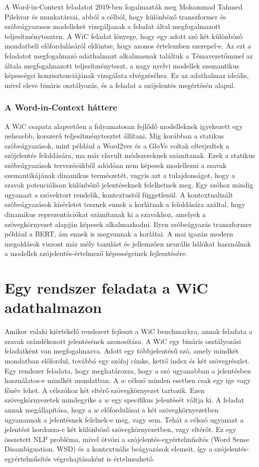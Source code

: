 \documentclass[12pt]{report}
\begin{document}
    A Word-in-Context feladatot 2019-ben fogalmazták meg Mohammad Tahmed Pilehvar és munkatársai, abból a célból, hogy különböző transzformer és szóbeágyazasos modelleket vizsgáljanak a feladat által megfogalmazott teljesítményteszten.
    A WiC feladat lényege, hogy egy adott szó két különböző mondatbeli előfordulásáról eldöntse, hogy azonos értelemben szerepel-e.
    Az ezt a feladatot megfogalmazó adathalmazt alkalmasnak találtuk a Témavezetőmmel az általa megfogalmazott teljesítményteszt, a nagy nyelvi modellek szemantikus képességei konzisztenciájának vizsgálata elvégzéséhez.
    Ez az adathalmaz ideális, mivel eleve bináris osztályozás, és a feladat a szójelentés megértésén alapul.

    \subsubsection{A Word-in-Context háttere}
    A WiC csapata alapvetően a folyamatosan fejlődő modelleknek igyekezett egy nehezebb, korszerű teljesítménytesztet állítani.
    Míg korábban a statikus szóbeágyazások, mint például a Word2vec és a GloVe voltak elterjedtek a szójelentés feloldására, ma már elavult módszereknek számítanak.
    Ezek a statikus szóbeágyazások tervezésükből adódóan nem képesek modellezni a szavak szemantikájának dinamikus természetét, vagyis azt a tulajdonságot, hogy a szavak potenciálisan különböző jelentéseknek felelhetnek meg.
    Egy szóhoz mindig ugyanazt a szóvektort rendelik, kontextustól függetlenül.
    A kontextualizált szóbeágyazások kísérletet tesznek ennek a korlátnak a feloldására azáltal, hogy dinamikus reprezentációkat számítanak ki a szavakhoz, amelyek a szövegkörnyezet alapján képesek alkalmazkodni.
    Ilyen szóbeágyazás transzformer például a BERT, ám ennek is megvannak a korlátai.
    A mai igazán modern megoldások viszont már mély tanulást és jellemzően neurális hálókat használnak a modellek szójelentés-értelmező képességeinek fejlesztésére.


    \section{Egy rendszer feladata a WiC adathalmazon}
    Amikor valaki kiértékelő rendszert fejleszt a WiC benchmarkra, annak feladata a szavak szándékozott jelentésének azonosítása.
    A WiC egy bináris osztályozási feladatként van megfogalmazva.
    Adott egy többjelentésű szó, amely mindkét mondatban előfordul, továbbá egy szófaj címke, kettő index és két szövegrészlet.
    Egy rendszer feladata, hogy meghatározza, hogy a szó ugyanabban a jelentésben használatos-e mindkét mondatban.
    A $w$ célszó minden esetben csak egy ige vagy főnév lehet.
    A célszóhoz két eltérő szövegkörnyezet tartozik.
    Ezen szövegkörnyezetek mindegyike a $w$ egy specifikus jelentését váltja ki.
    A feladat annak megállapítása, hogy a $w$ előfordulásai a két szövegkörnyezetben ugyanannak a jelentésnek felelnek-e meg, vagy sem.
    Tehát a célszó ugyanazt a jelentést hordozza-e két különböző szövegkörnyezetben, vagy eltérőt.
    Ez egy összetett NLP probléma, mivel ötvözi a szójelentés-egyértelműsítés (Word Sense Disambiguation, WSD) és a kontextuális beágyazások elemeit, így a szójelentés-egyértelműsítés végrehajtásaként is értelmezhető.
\end{document}
